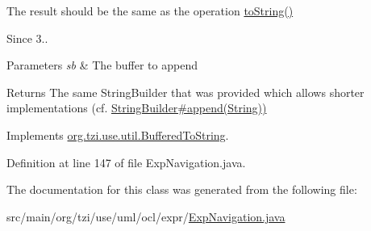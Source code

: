 The result should be the same as the operation \hyperlink{classorg_1_1tzi_1_1use_1_1uml_1_1ocl_1_1expr_1_1_expression_a01192513b1b1adbc44727a67ae14d02e}{to\-String()} 

\begin{DoxySince}{Since}
3.. 
\end{DoxySince}

\begin{DoxyParams}{Parameters}
{\em sb} & The buffer to append \\
\hline
\end{DoxyParams}
\begin{DoxyReturn}{Returns}
The same String\-Builder that was provided which allows shorter implementations (cf. \hyperlink{}{String\-Builder\#append(\-String))} 
\end{DoxyReturn}


Implements \hyperlink{interfaceorg_1_1tzi_1_1use_1_1util_1_1_buffered_to_string_aea95e4e53b18818d50ee253700e6e2d5}{org.\-tzi.\-use.\-util.\-Buffered\-To\-String}.



Definition at line 147 of file Exp\-Navigation.\-java.



The documentation for this class was generated from the following file\-:\begin{DoxyCompactItemize}
\item 
src/main/org/tzi/use/uml/ocl/expr/\hyperlink{_exp_navigation_8java}{Exp\-Navigation.\-java}\end{DoxyCompactItemize}
